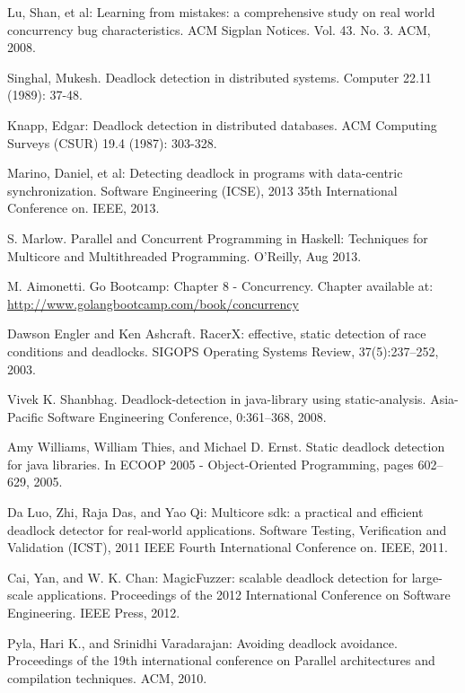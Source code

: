 \begin{thebibliography}{4}

 Lu, Shan, et al: Learning from mistakes: a comprehensive study on real world concurrency bug characteristics.
ACM Sigplan Notices. Vol. 43. No. 3. ACM, 2008.

 Singhal, Mukesh. Deadlock detection in distributed systems.
Computer 22.11 (1989): 37-48.

 Knapp, Edgar: Deadlock detection in distributed databases.
ACM Computing Surveys (CSUR) 19.4 (1987): 303-328.

 Marino, Daniel, et al: Detecting deadlock in programs with data-centric synchronization.
Software Engineering (ICSE), 2013 35th International Conference on. IEEE, 2013.

 S. Marlow. Parallel and Concurrent Programming in Haskell: Techniques for Multicore and Multithreaded Programming. O'Reilly, Aug 2013.

 M. Aimonetti. Go Bootcamp: Chapter 8 - Concurrency. Chapter available at: \url{http://www.golangbootcamp.com/book/concurrency}

 Dawson Engler and Ken Ashcraft. RacerX: effective, static detection of race conditions and
deadlocks. SIGOPS Operating Systems Review, 37(5):237–252, 2003.

 Vivek K. Shanbhag. Deadlock-detection in java-library using static-analysis. Asia-Pacific
Software Engineering Conference, 0:361–368, 2008.

 Amy Williams, William Thies, and Michael D. Ernst. Static deadlock detection for java
libraries. In ECOOP 2005 - Object-Oriented Programming, pages 602–629, 2005.

 Da Luo, Zhi, Raja Das, and Yao Qi: Multicore sdk: a practical and efficient deadlock detector for real-world applications.
Software Testing, Verification and Validation (ICST), 2011 IEEE Fourth International Conference on. IEEE, 2011.

 Cai, Yan, and W. K. Chan: MagicFuzzer: scalable deadlock detection for large-scale applications.
Proceedings of the 2012 International Conference on Software Engineering. IEEE Press, 2012.

 Pyla, Hari K., and Srinidhi Varadarajan: Avoiding deadlock avoidance.
Proceedings of the 19th international conference on Parallel architectures and compilation techniques. ACM, 2010.


\end{thebibliography}
